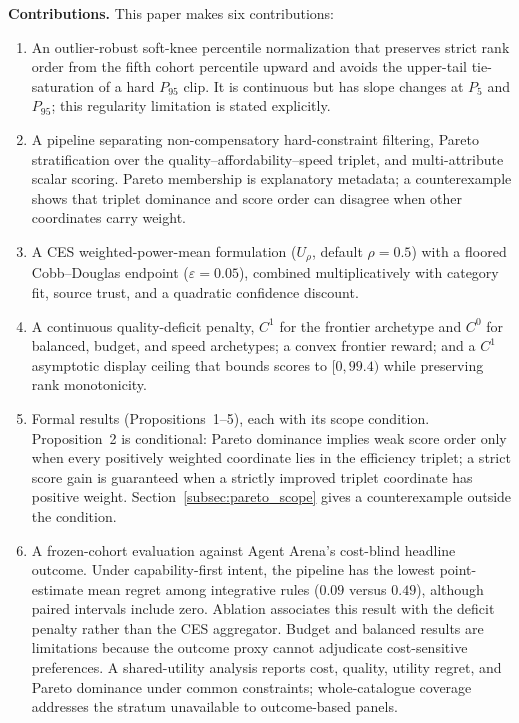 \documentclass[pdflatex,sn-mathphys-num]{sn-jnl}
\theoremstyle{thmstyleone}
\theoremstyle{thmstylethree}
\begin{document}
\textbf{Contributions.} This paper makes six contributions:
\begin{enumerate}
  \item An outlier-robust soft-knee percentile normalization that preserves strict rank order from the fifth cohort percentile upward and avoids the upper-tail tie-saturation of a hard $P_{95}$ clip. It is continuous but has slope changes at $P_5$ and $P_{95}$; this regularity limitation is stated explicitly.
  \item A pipeline separating non-compensatory hard-constraint filtering, Pareto stratification over the quality--affordability--speed triplet, and multi-attribute scalar scoring. Pareto membership is explanatory metadata; a counterexample shows that triplet dominance and score order can disagree when other coordinates carry weight.
  \item A CES weighted-power-mean formulation ($U_\rho$, default $\rho=0.5$) with a floored Cobb--Douglas endpoint ($\varepsilon=0.05$), combined multiplicatively with category fit, source trust, and a quadratic confidence discount.
  \item A continuous quality-deficit penalty, $C^1$ for the frontier archetype and $C^0$ for balanced, budget, and speed archetypes; a convex frontier reward; and a $C^1$ asymptotic display ceiling that bounds scores to $[0,99.4)$ while preserving rank monotonicity.
  \item Formal results (Propositions~1--5), each with its scope condition. Proposition~2 is conditional: Pareto dominance implies weak score order only when every positively weighted coordinate lies in the efficiency triplet; a strict score gain is guaranteed when a strictly improved triplet coordinate has positive weight. Section~\ref{subsec:pareto_scope} gives a counterexample outside the condition.
  \item A frozen-cohort evaluation against Agent Arena's cost-blind headline outcome. Under capability-first intent, the pipeline has the lowest point-estimate mean regret among integrative rules ($0.09$ versus $0.49$), although paired intervals include zero. Ablation associates this result with the deficit penalty rather than the CES aggregator. Budget and balanced results are limitations because the outcome proxy cannot adjudicate cost-sensitive preferences. A shared-utility analysis reports cost, quality, utility regret, and Pareto dominance under common constraints; whole-catalogue coverage addresses the stratum unavailable to outcome-based panels.
\end{enumerate}
\end{document}
